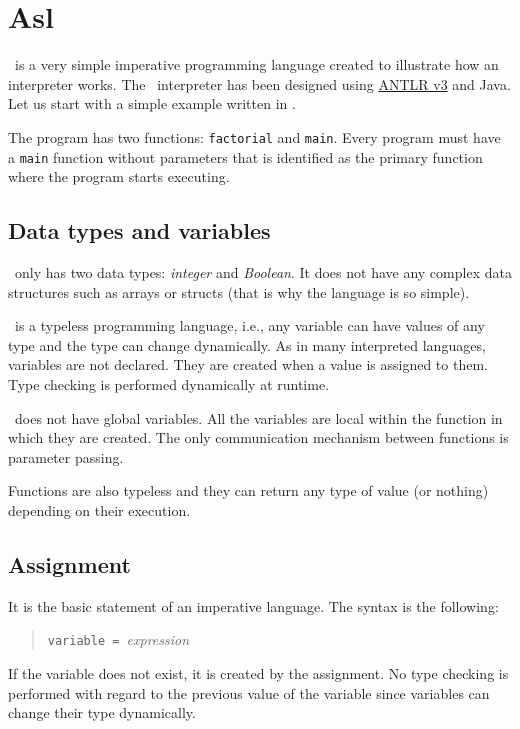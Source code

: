 \section{Asl}

\asl\ is a very simple imperative programming language created to illustrate
how an interpreter works. The \asl\ interpreter has been designed using
\href{http://www.antlr.org}{ANTLR v3} and Java.
Let us start with a simple example written in \asl.



The program has two functions: \texttt{factorial} and \texttt{main}.
Every program must have a \texttt{main} function without parameters
that is identified as the primary function where the program starts
executing.

\subsection{Data types and variables}

\asl\ only has two data types: \emph{integer} and \emph{Boolean}.
It does not have any complex data structures such as arrays or structs
(that is why the language is so simple).

\asl\ is a typeless programming language, i.e., any variable can have
values of any type and the type can change dynamically. As in many
interpreted languages, variables are not declared. They are created
when a value is assigned to them. Type checking is performed dynamically
at runtime.

\asl\ does not have global variables. All the variables are local within
the function in which they are created. The only communication mechanism
between functions is parameter passing.

Functions are also typeless and they can return any type of value
(or nothing) depending on their execution.

\subsection{Assignment}

It is the basic statement of an imperative language. The syntax is
the following:

\begin{quote}
\texttt{variable = }\emph{expression}
\end{quote}

If the variable does not exist, it is created by the assignment.
No type checking is performed with regard to the previous value of
the variable since variables can change their type dynamically.

